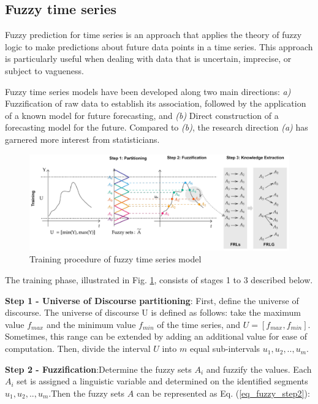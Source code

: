 \documentclass[conference]{IEEEtran}
\begin{document}
\subsection{Fuzzy time series}
Fuzzy prediction for time series is an approach that applies the theory of fuzzy logic to make predictions about future data points in a time series. This approach is particularly useful when dealing with data that is uncertain, imprecise, or subject to vagueness.\par
Fuzzy time series models have been developed along two main directions: \textit{a)} Fuzzification of raw data to establish its association, followed by the application of a known model for future forecasting, and \textit{(b)} Direct construction of a forecasting model for the future. Compared to \textit{(b)}, the research direction \textit{(a)} has garnered more interest from statisticians.\par
\begin{figure}[H]
    \centering
    \begin{minipage}{0.45\textwidth}
    \centering
    \includegraphics[width=1\textwidth]{figures/method/Fuzzy_Training.png}
    \caption{Training procedure of fuzzy time series model}
    \label{fig_fuzzy_training}
    \end{minipage}
\end{figure}
The training phase, illustrated in Fig. \ref{fig_fuzzy_training}, consists of stages 1 to 3 described below.\par
\textbf{Step 1 - Universe of Discourse partitioning}: First, define the universe of discourse. The universe of discourse U is defined as follows: take the maximum value \(f_{max}\) and the minimum value \(f_{min}\) of the time series, and \(U = [f_{max}, f_{min}]\). Sometimes, this range can be extended by adding an additional value for ease of computation. Then, divide the interval \(U\) into \(m\) equal sub-intervals \(u_1, u_2,.., u_m\).\par
\textbf{Step 2 - Fuzziﬁcation}:Determine the fuzzy sets \(A_i\) and fuzzify the values. Each \(A_i\) set is assigned a linguistic variable and determined on the identified segments \(u_1, u_2,.., u_m\).Then the fuzzy sets \(A\) can be represented as Eq. (\ref{eq_fuzzy_step2}):
\end{document}
